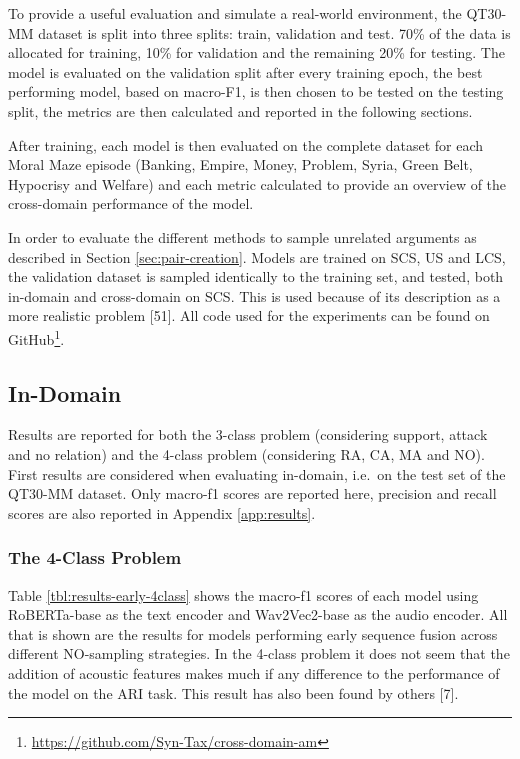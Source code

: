 \documentclass[twocolumn,twoside]{article}
\begin{document}
To provide a useful evaluation and simulate a real-world environment,
the QT30-MM dataset is split into three splits: train, validation and
test. 70\% of the data is allocated for training, 10\% for validation
and the remaining 20\% for testing. The model is evaluated on the
validation split after every training epoch, the best performing model,
based on macro-F1, is then chosen to be tested on the testing split, the
metrics are then calculated and reported in the following sections.

After training, each model is then evaluated on the complete dataset for
each Moral Maze episode (Banking, Empire, Money, Problem, Syria, Green
Belt, Hypocrisy and Welfare) and each metric calculated to provide an
overview of the cross-domain performance of the model.

In order to evaluate the different methods to sample unrelated arguments
as described in Section \ref{sec:pair-creation}. Models are trained on
SCS, US and LCS, the validation dataset is sampled identically to the
training set, and tested, both in-domain and cross-domain on SCS. This
is used because of its description as a more realistic problem {[}51{]}.
All code used for the experiments can be found on GitHub\footnote{\url{https://github.com/Syn-Tax/cross-domain-am}}.

\subsection{In-Domain}\label{sec:res-id}

Results are reported for both the 3-class problem (considering support,
attack and no relation) and the 4-class problem (considering RA, CA, MA
and NO). First results are considered when evaluating in-domain, i.e.~on
the test set of the QT30-MM dataset. Only macro-f1 scores are reported
here, precision and recall scores are also reported in Appendix
\ref{app:results}.

\subsubsection{The 4-Class Problem}\label{sec:id-4class}

Table \ref{tbl:results-early-4class} shows the macro-f1 scores of each
model using RoBERTa-base as the text encoder and Wav2Vec2-base as the
audio encoder. All that is shown are the results for models performing
early sequence fusion across different NO-sampling strategies. In the
4-class problem it does not seem that the addition of acoustic features
makes much if any difference to the performance of the model on the ARI
task. This result has also been found by others {[}7{]}.
\end{document}
